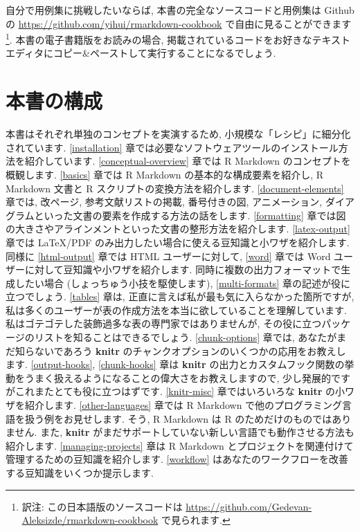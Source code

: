 \documentclass[
  11pt,
]{bxjsreport}
\begin{document}
自分で用例集に挑戦したいならば, 本書の完全なソースコードと用例集は Github の \url{https://github.com/yihui/rmarkdown-cookbook} で自由に見ることができます\footnote{訳注: この日本語版のソースコードは \url{https://github.com/Gedevan-Aleksizde/rmarkdown-cookbook} で見られます.}. 本書の電子書籍版をお読みの場合, 掲載されているコードをお好きなテキストエディタにコピー\&ペーストして実行することになるでしょう.

\hypertarget{Structure-of-the-book}{%
\section*{本書の構成}\label{Structure-of-the-book}}

本書はそれぞれ単独のコンセプトを実演するため, 小規模な「レシピ」に細分化されています. \ref{installation} 章では必要なソフトウェアツールのインストール方法を紹介しています. \ref{conceptual-overview} 章では R Markdown のコンセプトを概観します. \ref{basics} 章では R Markdown の基本的な構成要素を紹介し, R Markdown 文書と R スクリプトの変換方法を紹介します. \ref{document-elements} 章では, 改ページ, 参考文献リストの掲載, 番号付きの図, アニメーション, ダイアグラムといった文書の要素を作成する方法の話をします. \ref{formatting} 章では図の大きさやアラインメントといった文書の整形方法を紹介します. \ref{latex-output} 章では LaTeX/PDF のみ出力したい場合に使える豆知識と小ワザを紹介します. 同様に \ref{html-output} 章では HTML ユーザーに対して, \ref{word} 章では Word ユーザーに対して豆知識や小ワザを紹介します. 同時に複数の出力フォーマットで生成したい場合 (しょっちゅう小技を駆使します), \ref{multi-formats} 章の記述が役に立つでしょう. \ref{tables} 章は, 正直に言えば私が最も気に入らなかった箇所ですが, 私は多くのユーザーが表の作成方法を本当に欲していることを理解しています. 私はゴテゴテした装飾過多な表の専門家ではありませんが, その役に立つパッケージのリストを知ることはできるでしょう. \ref{chunk-options} 章では, あなたがまだ知らないであろう \textbf{knitr} のチャンクオプションのいくつかの応用をお教えします. \ref{output-hooks}, \ref{chunk-hooks} 章は \textbf{knitr} の出力とカスタムフック関数の挙動をうまく扱えるようになることの偉大さをお教えしますので, 少し発展的ですがこれまたとても役に立つはずです. \ref{knitr-misc} 章ではいろいろな \textbf{knitr} の小ワザを紹介します. \ref{other-languages} 章では R Markdown で他のプログラミング言語を扱う例をお見せします. そう, R Markdown は R のためだけのものではありません. また, \textbf{knitr} がまだサポートしていない新しい言語でも動作させる方法も紹介します. \ref{managing-projects} 章は R Markdown とプロジェクトを関連付けて管理するための豆知識を紹介します. \ref{workflow} はあなたのワークフローを改善する豆知識をいくつか提示します.
\end{document}
